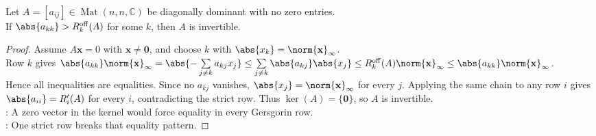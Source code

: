 \begin{theorem} \label{thm:weak-diagonal-dominance-invertible-with-one-strict-row} \\
Let $A=[a_{ij}]\in\operatorname{Mat}(n,n,\mathbb{C})$ be diagonally dominant with no zero entries.\\
If $\abs{a_{kk}}>R_k^{\mathrm{off}}(A)$ for some $k$, then $A$ is invertible.
\begin{proof}
Assume $A\mathbf{x}=0$ with $\mathbf{x}\neq\mathbf{0}$, and choose $k$ with $\abs{x_k}=\norm{\mathbf{x}}_{\infty}$.\\
Row $k$ gives $\abs{a_{kk}}\norm{\mathbf{x}}_{\infty} =\abs{-\sum\limits_{j\neq k}a_{kj}x_j} \leq\sum\limits_{j\neq k}\abs{a_{kj}}\abs{x_j} \leq R_k^{\mathrm{off}}(A)\norm{\mathbf{x}}_{\infty} \leq \abs{a_{kk}}\norm{\mathbf{x}}_{\infty}$.\\
Hence all inequalities are equalities. Since no $a_{kj}$ vanishes, $\abs{x_j}=\norm{\mathbf{x}}_{\infty}$ for every $j$. Applying the same chain to any row $i$ gives $\abs{a_{ii}}=R'_i(A)$ for every $i$, contradicting the strict row. Thus $\ker(A)=\{\mathbf{0}\}$, so $A$ is invertible.\\
: A zero vector in the kernel would force equality in every Gersgorin row.\\
: One strict row breaks that equality pattern.
\end{proof}
\end{theorem}
